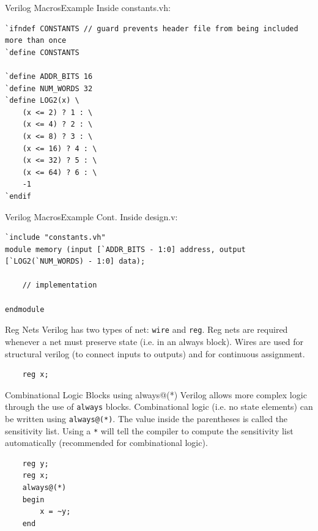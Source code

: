 \documentclass{beamer}
\begin{document}
\begin{frame}[fragile]{Verilog Macros}{Example}
Inside constants.vh:
\begin{verbatim}
`ifndef CONSTANTS // guard prevents header file from being included more than once
`define CONSTANTS

`define ADDR_BITS 16
`define NUM_WORDS 32
`define LOG2(x) \
	(x <= 2) ? 1 : \
	(x <= 4) ? 2 : \
	(x <= 8) ? 3 : \
	(x <= 16) ? 4 : \
	(x <= 32) ? 5 : \
	(x <= 64) ? 6 : \
	-1
`endif
\end{verbatim}
\end{frame}

\begin{frame}[fragile]{Verilog Macros}{Example Cont.}
Inside design.v:
\begin{verbatim}
`include "constants.vh"
module memory (input [`ADDR_BITS - 1:0] address, output [`LOG2(`NUM_WORDS) - 1:0] data);

	// implementation
	
endmodule
\end{verbatim}
\end{frame}

\begin{frame}[fragile]{Reg Nets}
	Verilog has two types of net: \texttt{wire} and \texttt{reg}.
	Reg nets are required whenever a net must preserve state (i.e. in an always block).
	Wires are used for structural verilog (to connect inputs to outputs) and for continuous assignment.

\begin{verbatim}
	reg x;
\end{verbatim}

\end{frame}

\begin{frame}[fragile]{Combinational Logic Blocks using always@(*)}
	Verilog allows more complex logic through the use of \texttt{always} blocks.
	Combinational logic (i.e. no state elements) can be written using \texttt{always@(*)}.
	The value inside the parentheses is called the sensitivity list.
	Using a \texttt{*} will tell the compiler to compute the sensitivity list automatically (recommended for combinational logic).

\begin{verbatim}
	reg y;
	reg x;
	always@(*)
	begin
		x = ~y;
	end
\end{verbatim}

\end{frame}
\end{document}
